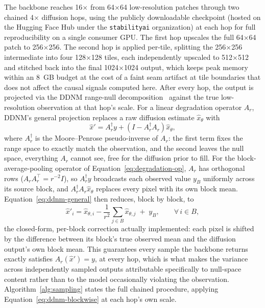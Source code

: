 \documentclass[review]{elsarticle}
\begin{document}
The backbone reaches 16$\times$ from 64$\times$64 low-resolution patches through two chained 4$\times$ diffusion hops, using the publicly downloadable checkpoint \texttt{} (hosted on the Hugging Face Hub under the \texttt{stabilityai} organization) at each hop for full reproducibility on a single consumer GPU. The first hop upscales the full 64$\times$64 patch to 256$\times$256. The second hop is applied per-tile, splitting the 256$\times$256 intermediate into four 128$\times$128 tiles, each independently upscaled to 512$\times$512 and stitched back into the final 1024$\times$1024 output, which keeps peak memory within an 8~GB budget at the cost of a faint seam artifact at tile boundaries that does not affect the causal signals computed here. After every hop, the output is projected via the DDNM range-null decomposition~\citep{wang2023ddnm} against the true low-resolution observation at that hop's scale. For a linear degradation operator $A_r$, DDNM's general projection replaces a raw diffusion estimate $\hat{x}_\theta$ with
\begin{equation}
\hat{x}' = A_r^{\dagger} y + \left(I - A_r^{\dagger} A_r\right) \hat{x}_\theta,
\label{eq:ddnm-general}
\end{equation}
where $A_r^{\dagger}$ is the Moore--Penrose pseudo-inverse of $A_r$: the first term fixes the range space to exactly match the observation, and the second leaves the null space, everything $A_r$ cannot see, free for the diffusion prior to fill. For the block-average-pooling operator of Equation~\ref{eq:degradation-op}, $A_r$ has orthogonal rows ($A_r A_r^\top = r^{-2} I$), so $A_r^\dagger y$ broadcasts each observed value $y_B$ uniformly across its source block, and $A_r^\dagger A_r \hat{x}_\theta$ replaces every pixel with its own block mean. Equation~\ref{eq:ddnm-general} then reduces, block by block, to
\begin{equation}
\hat{x}'_i = \hat{x}_{\theta,i} - \frac{1}{r^2}\sum_{j \in B} \hat{x}_{\theta,j} \; + \; y_B, \qquad \forall\, i \in B,
\label{eq:ddnm-blockwise}
\end{equation}
the closed-form, per-block correction actually implemented: each pixel is shifted by the difference between its block's true observed mean and the diffusion output's own block mean. This guarantees every sample the backbone returns exactly satisfies $A_r(\hat{x}') = y$, at every hop, which is what makes the variance across independently sampled outputs attributable specifically to null-space content rather than to the model occasionally violating the observation. Algorithm~\ref{alg:sampling} states the full chained procedure, applying Equation~\ref{eq:ddnm-blockwise} at each hop's own scale.
\end{document}
